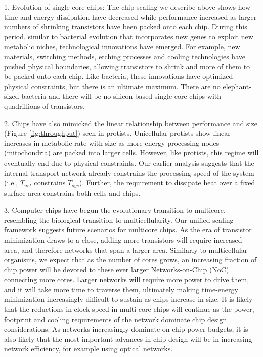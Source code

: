 \documentclass[12pt]{article}
\begin{document}
1.     Evolution of single core chips: The chip scaling we describe above shows
how time and energy dissipation have decreased while performance increased as
larger numbers of shrinking transistors have been packed onto each chip. During
this period, similar to bacterial evolution that incorporates new genes to
exploit new metabolic niches, technological innovations have emerged. For
example, new materials, switching methods, etching processes and cooling
technologies have pushed physical boundaries, allowing transistors to shrink
and more of them to be packed onto each chip. Like bacteria, these innovations
have optimized physical constraints, but there is an ultimate maximum. There
are no elephant-sized bacteria and there will be no silicon based single core
chips with quadrillions of transistors.

2.  Chips have also mimicked the linear relationship between performance and
size (Figure \ref{fig:throughput}) seen in protists. Unicellular protists show linear increases
in metabolic rate with size as more energy processing nodes  (mitochondria) are
packed into larger cells. However, like protists, this regime will eventually end due
to physical constraints.  Our earlier analysis suggests that the
internal transport network already constrains the processing speed of the
system (i.e., $T_{net}$ constrains $T_{sys}$). Further, the requirement to
dissipate heat over a fixed surface area constrains both cells and chips. 

3. Computer chips have begun the evolutionary transition to multicore, resembling the
biological transition to multicellularity. Our unified scaling framework
suggests future scenarios for multicore chips. As the era of transistor
minimization draws to a close, adding more transistors will require increased
area, and therefore networks that span a larger area. Similarly to
multicellular organisms, we expect that as the number of cores grows, an
increasing fraction of chip power will be devoted to these ever larger 
Networks-on-Chip (NoC) connecting more cores. Larger networks will require more
power to drive them, and it will take more time to traverse them, ultimately
making time-energy minimization increasingly difficult to sustain as chips increase in
size. It is likely that the reductions in clock speed
in multi-core chips will continue as the power, footprint and cooling requirements of the network dominate chip design considerations. As networks increasingly dominate on-chip power
budgets, it is also likely that the most important advances in chip design will be in increasing
network efficiency, for example using optical networks. 
\end{document}
